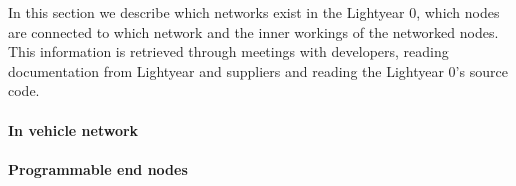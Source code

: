 In this section we describe which networks exist in the Lightyear 0, which nodes are connected to which network and the inner workings of the networked nodes. This information is retrieved through meetings with developers, reading documentation from Lightyear and suppliers and reading the Lightyear 0's source code.
\paragraph{In vehicle network}

\paragraph{Programmable end nodes}
